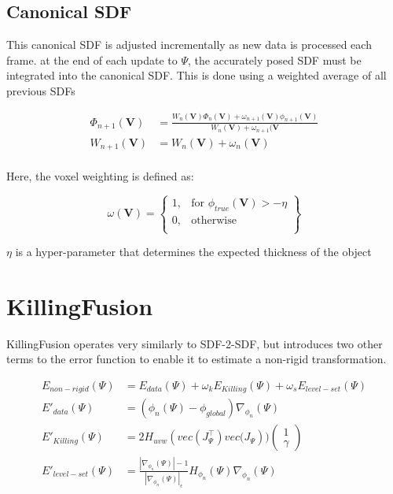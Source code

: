\documentclass[12pt,twoside]{report}
\begin{document}
\subsection{Canonical SDF}


This canonical SDF is adjusted incrementally as new data is processed each frame. 
at the end of each update to $\Psi$, the accurately posed SDF must be integrated into the canonical SDF. This is done using a weighted average of all previous SDFs

\begin{align*}
\Phi_{n+1}(\textbf{V}) &= \frac{W_n(\textbf{V})\Phi_n(\textbf{V}) + \omega_{n+1}(\textbf{V})\phi_{n+1}(\textbf{V})}{W_{n}(\textbf{V}) + \omega_{n+1}(\textbf{V}}\\
W_{n+1}(\textbf{V}) &= W_n(\textbf{V}) + \omega_n(\textbf{V}) \\
\end{align*}

Here, the voxel weighting is defined as:

\[
    \omega(\textbf{V}) = \left\{\begin{array}{lr}
    1, & \text{for } \phi_{true}(\textbf{V}) > - \eta\\
    0, & \text{otherwise}\\
    \end{array}\right\}
\]

$\eta$ is a hyper-parameter that determines the expected thickness of the object 


\section{KillingFusion}

KillingFusion operates very similarly to SDF-2-SDF, but introduces two other terms to the error function to enable it to estimate a non-rigid transformation.

\begin{align*}
E_{non-rigid}(\Psi) &= E_{data}(\Psi) + \omega_kE_{Killing}(\Psi) + \omega_sE_{level-set}(\Psi)\\
E'_{data}(\Psi) &= (\phi_n(\Psi) - \phi_{global}) \nabla_{\phi_n}(\Psi)\\
E'_{Killing}(\Psi) &= 2H_{uvw}(vec(J^{\top}_{\Psi}) vec\big(J_{\Psi})\big)\begin{pmatrix}1\\\gamma \end{pmatrix}\\
E'_{level-set}(\Psi) &= \frac{|\nabla_{\phi_n}(\Psi)| - 1}{|\nabla_{\phi_n}(\Psi)|_\epsilon}H_{\phi_n}(\Psi)\nabla_{\phi_n}(\Psi)
\end{align*}
\end{document}
